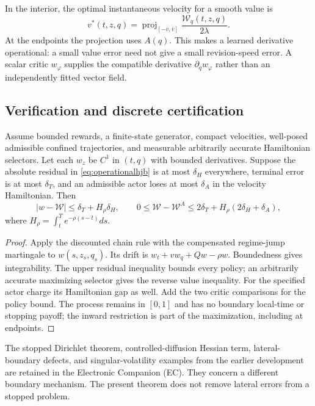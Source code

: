 In the interior, the optimal instantaneous velocity for a smooth value is
\begin{equation}\label{eq:gradientactor}
 v^*(t,z,q)=\operatorname{proj}_{[-\bar v,\bar v]}
                    \frac{\mathcal W_q(t,z,q)}{2\lambda}.
\end{equation}
At the endpoints the projection uses $A(q)$. This makes a learned derivative operational: a small value error need not give a small revision-speed error. A scalar critic $w_\varphi$ supplies the compatible derivative $\partial_qw_\varphi$ rather than an independently fitted vector field.

\subsection{Verification and discrete certification}
\begin{theorem}\label{thm:jumpcertificate}
Assume bounded rewards, a finite-state generator, compact velocities, well-posed admissible confined trajectories, and measurable arbitrarily accurate Hamiltonian selectors. Let each $w_z$ be $C^1$ in $(t,q)$ with bounded derivatives. Suppose the absolute residual in \eqref{eq:operationalhjb} is at most $\delta_H$ everywhere, terminal error is at most $\delta_T$, and an admissible actor loses at most $\delta_A$ in the velocity Hamiltonian. Then
\[
 |w-\mathcal W|\leq\delta_T+H_\rho\delta_H,
 \qquad
 0\leq\mathcal W-\mathcal W^{A}\leq
 2\delta_T+H_\rho(2\delta_H+\delta_A),
\]
where $H_\rho=\int_t^T e^{-\rho(s-t)}ds$.
\end{theorem}
\begin{proof}
Apply the discounted chain rule with the compensated regime-jump martingale to $w(s,z_s,q_s)$. Its drift is $w_t+v w_q+Qw-\rho w$. Boundedness gives integrability. The upper residual inequality bounds every policy; an arbitrarily accurate maximizing selector gives the reverse value inequality. For the specified actor charge its Hamiltonian gap as well. Add the two critic comparisons for the policy bound. The process remains in $[0,1]$ and has no boundary local-time or stopping payoff; the inward restriction is part of the maximization, including at endpoints.\end{proof}
The stopped Dirichlet theorem, controlled-diffusion Hessian term, lateral-boundary defects, and singular-volatility examples from the earlier development are retained in the Electronic Companion (EC). They concern a different boundary mechanism. The present theorem does not remove lateral errors from a stopped problem.

